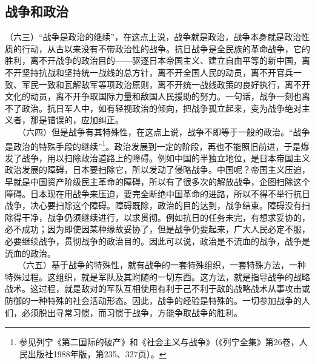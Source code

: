 \documentclass[cn,11pt,chinese]{elegantbook}
\def\myformat#1{\hfil\hfil #1}
\begin{document}
\subsection*{\myformat{战争和政治}}
（六三）“战争是政治的继续”，在这点上说，战争就是政治，战争本身就是政治性质的行动，从古以来没有不带政治性的战争。抗日战争是全民族的革命战争，它的胜利，离不开战争的政治目的——驱逐日本帝国主义、建立自由平等的新中国，离不开坚持抗战和坚持统一战线的总方针，离不开全国人民的动员，离不开官兵一致、军民一致和瓦解敌军等项政治原则，离不开统一战线政策的良好执行，离不开文化的动员，离不开争取国际力量和敌国人民援助的努力。一句话，战争一刻也离不了政治。抗日军人中，如有轻视政治的倾向，把战争孤立起来，变为战争绝对主义者，那是错误的，应加纠正。\\
　　（六四）但是战争有其特殊性，在这点上说，战争不即等于一般的政治。“战争是政治的特殊手段的继续”\footnote[21]{ 参见列宁《第二国际的破产》和《社会主义与战争》（《列宁全集》第26卷，人民出版社1988年版，第235、327页）。}。政治发展到一定的阶段，再也不能照旧前进，于是爆发了战争，用以扫除政治道路上的障碍。例如中国的半独立地位，是日本帝国主义政治发展的障碍，日本要扫除它，所以发动了侵略战争。中国呢？帝国主义压迫，早就是中国资产阶级民主革命的障碍，所以有了很多次的解放战争，企图扫除这个障碍。日本现在用战争来压迫，要完全断绝中国革命的进路，所以不得不举行抗日战争，决心要扫除这个障碍。障碍既除，政治的目的达到，战争结束。障碍没有扫除得干净，战争仍须继续进行，以求贯彻。例如抗日的任务未完，有想求妥协的，必不成功；因为即使因某种缘故妥协了，但是战争仍要起来，广大人民必定不服，必要继续战争，贯彻战争的政治目的。因此可以说，政治是不流血的战争，战争是流血的政治。\\
　　（六五）基于战争的特殊性，就有战争的一套特殊组织，一套特殊方法，一种特殊过程。这组织，就是军队及其附随的一切东西。这方法，就是指导战争的战略战术。这过程，就是敌对的军队互相使用有利于己不利于敌的战略战术从事攻击或防御的一种特殊的社会活动形态。因此，战争的经验是特殊的。一切参加战争的人们，必须脱出寻常习惯，而习惯于战争，方能争取战争的胜利。\\
\end{document}
